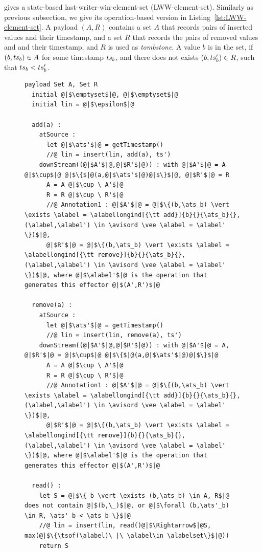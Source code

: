 \cite{ShapiroPBZ11} gives a state-based last-writer-win-element-set (LWW-element-set). Similarly as previous subsection, we give its operation-based version in Listing~\ref{lst:LWW-element-set}. A payload $(A,R)$ contains a set $A$ that records pairs of inserted values and their timestamp, and a set $R$ that records the pairs of removed values and and their timestamp, and $R$ is used as \emph{tombstone}. A value $b$ is in the set, if $(b,ts_b) \in A$ for some timestamp $ts_b$, and there does not exists $(b,ts'_b) \in R$, such that $ts_b < ts'_b$.


\begin{figure}[t]
\begin{lstlisting}[frame=top,caption={Pseudo-code of LWW-element-set},
captionpos=b,label={lst:LWW-element-set}]
  payload Set A, Set R
  initial @|$\emptyset$|@, @|$\emptyset$|@
  initial lin = @|$\epsilon$|@

  add(a) :
    atSource :
      let @|$\ats'$|@ = getTimestamp()
      //@ lin = insert(lin, add(a), ts')
    downStream((@|$A'$|@,@|$R'$|@)) : with @|$A'$|@ = A @|$\cup$|@ @|$\{$|@(a,@|$\ats'$|@)@|$\}$|@, @|$R'$|@ = R
      A = A @|$\cup \ A'$|@
      R = R @|$\cup \ R'$|@
      //@ Annotation1 : @|$A'$|@ = @|$\{(b,\ats_b) \vert \exists \alabel = \alabellongind[{\tt add}]{b}{}{\ats_b}{}, (\alabel,\alabel') \in \avisord \vee \alabel = \alabel' \})$|@,
      @|$R'$|@ = @|$\{(b,\ats_b) \vert \exists \alabel = \alabellongind[{\tt remove}]{b}{}{\ats_b}{}, (\alabel,\alabel') \in \avisord \vee \alabel = \alabel' \})$|@, where @|$\alabel'$|@ is the operation that generates this effector @|$(A',R')$|@

  remove(a) :
    atSource :
      let @|$\ats'$|@ = getTimestamp()
      //@ lin = insert(lin, remove(a), ts')
    downStream((@|$A'$|@,@|$R'$|@)) : with @|$A'$|@ = A, @|$R'$|@ = @|$\cup$|@ @|$\{$|@(a,@|$\ats'$|@)@|$\}$|@
      A = A @|$\cup \ A'$|@
      R = R @|$\cup \ R'$|@
      //@ Annotation1 : @|$A'$|@ = @|$\{(b,\ats_b) \vert \exists \alabel = \alabellongind[{\tt add}]{b}{}{\ats_b}{}, (\alabel,\alabel') \in \avisord \vee \alabel = \alabel' \})$|@,
      @|$R'$|@ = @|$\{(b,\ats_b) \vert \exists \alabel = \alabellongind[{\tt remove}]{b}{}{\ats_b}{}, (\alabel,\alabel') \in \avisord \vee \alabel = \alabel' \})$|@, where @|$\alabel'$|@ is the operation that generates this effector @|$(A',R')$|@

  read() :
    let S = @|$\{ b \vert \exists (b,\ats_b) \in A, R$|@ does not contain @|$(b,\_)$|@, or @|$\forall (b,\ats'_b) \in R, \ats'_b < \ats_b \}$|@
    //@ lin = insert(lin, read()@|$\Rightarrow$|@S, max(@|$\{\tsof(\alabel)\ |\ \alabel\in \alabelset\}$|@))
    return S
\end{lstlisting}
\end{figure}



